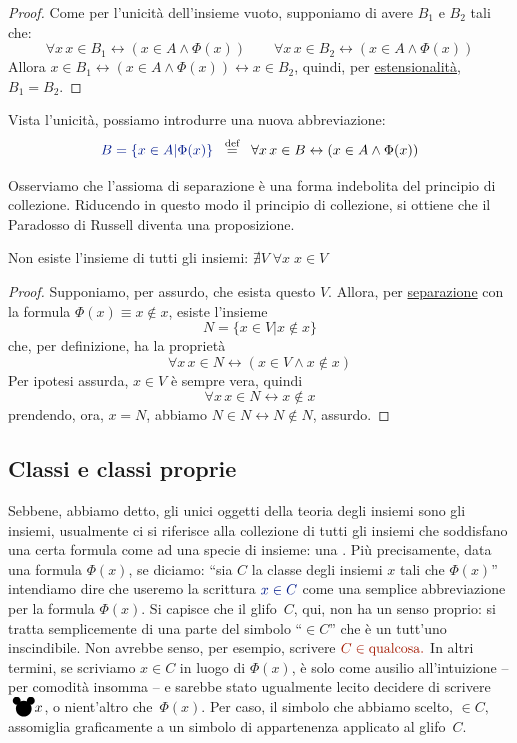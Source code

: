 \begin{proof}
Come per l'unicit\`a dell'insieme vuoto, supponiamo di avere $B_1$ e $B_2$ tali che:
\[ \forall x \, x \in B_1 \leftrightarrow (x \in A \land \Phi(x)) \qquad
\forall x \, x \in B_2 \leftrightarrow (x \in A \land \Phi(x))
	\]
Allora $x \in B_1 \leftrightarrow (x \in A \land \Phi(x))
\leftrightarrow x \in B_2$, quindi, per \hyperref[ax2]{estensionalit\`a}, $B_1 = B_2$.
\end{proof}

\begin{notation}
Vista l'unicit\`a, possiamo introdurre una nuova abbreviazione:
\[ {\drkblu B = \{x \in A | \Phi(x)\}} \;\;\Mydef\;\; \forall x \, x \in B
\leftrightarrow (x \in A \land \Phi(x))
	\]
\end{notation}

Osserviamo che l'assioma di separazione \`e una forma indebolita del
principio di collezione. Riducendo in questo modo il principio di
collezione, si ottiene che il Paradosso di Russell diventa una proposizione.

\begin{proposition}
Non esiste l'insieme di tutti gli insiemi: $\nexists V \; \forall x \;
x \in V$
\end{proposition}

\begin{proof}
Supponiamo, per assurdo, che esista questo $V$. Allora, per
\hyperref[ax3]{separazione} con la formula $\Phi(x) \equiv x \not \in x$, esiste l'insieme
\[ N = \{x \in V | x \not\in x\}
	\]
che, per definizione, ha la propriet\`a
\[ \forall x \, x \in N \leftrightarrow (x \in V \land x \not \in x)
	\]
Per ipotesi assurda, $x \in V$ \`e sempre vera, quindi
\[ \forall x \, x \in N \leftrightarrow x \not\in x
	\]
prendendo, ora, $x = N$, abbiamo $N \in N \leftrightarrow N \not\in N$, assurdo.
\end{proof}

\subsection{Classi e classi proprie}
Sebbene, abbiamo detto, gli unici oggetti della teoria degli insiemi sono gli insiemi, usualmente ci si riferisce alla collezione di tutti gli insiemi 
che soddisfano una certa formula come ad una specie di insieme: una
. Pi\`u precisamente, data una formula $\Phi(x)$, se diciamo:
``sia $C$ la classe degli insiemi $x$ tali che $\Phi(x)$''
intendiamo dire che useremo la scrittura $\drkblu x \in C$ come una semplice
abbreviazione per la formula $\Phi(x)$. Si capisce che il glifo~$C$,
qui, non ha un senso proprio: si tratta semplicemente di una parte del
simbolo ``$\in C$'' che \`e un tutt'uno inscindibile.
Non avrebbe senso, per esempio, scrivere $\drkred C \in \text{qualcosa}.$ In altri
termini, se scriviamo $x \in C$ in luogo di $\Phi(x)$, \`e solo come ausilio
all'intuizione -- per comodit\`a insomma -- e sarebbe stato ugualmente
lecito
decidere di scrivere $\mouse x$, o nient'altro
che~$\Phi(x)$. Per caso, il simbolo che abbiamo scelto, $\in C,$
assomiglia graficamente a un simbolo di appartenenza applicato al
glifo~$C$.

